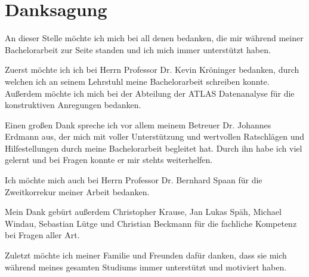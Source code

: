 \chapter*{Danksagung}
An dieser Stelle m\"ochte ich mich bei all denen bedanken,
die mir w\"ahrend meiner Bachelorarbeit zur Seite standen und
ich mich immer unterst\"utzt haben.

Zuerst m\"ochte ich ich bei Herrn Professor Dr. Kevin Kr\"oninger
bedanken, durch welchen ich an seinem Lehrstuhl meine Bachelorarbeit
schreiben konnte. Au\ss erdem m\"ochte ich mich bei der Abteilung der
ATLAS Datenanalyse f\"ur die konstruktiven Anregungen bedanken.

Einen gro\ss en Dank spreche ich vor allem meinem Betreuer Dr.
Johannes Erdmann aus, der mich mit voller Unterst\"utzung und
wertvollen Ratschl\"agen und Hilfestellungen durch meine
Bachelorarbeit begleitet hat. Durch ihn habe ich viel
gelernt und bei Fragen konnte er mir stehts weiterhelfen.

Ich m\"ochte mich auch bei Herrn Professor Dr. Bernhard Spaan
f\"ur die Zweitkorrekur meiner Arbeit bedanken.

Mein Dank geb\"urt au\ss erdem Christopher Krause, Jan Lukas
Sp\"ah, Michael Windau, Sebastian L\"utge und Christian Beckmann
f\"ur die fachliche Kompetenz bei Fragen aller Art.

Zuletzt m\"ochte ich meiner Familie und Freunden daf\"ur danken,
dass sie mich w\"ahrend meines gesamten Studiums immer
unterst\"utzt und motiviert haben.
